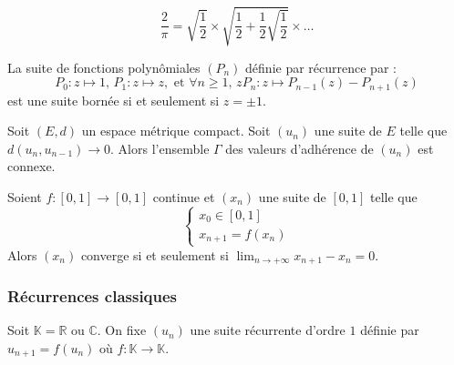   \begin{application}
    \[ \frac{2}{\pi} = \sqrt{\frac{1}{2}} \times \sqrt{\frac{1}{2} + \frac{1}{2} \sqrt{\frac{1}{2}}} \times \dots \]
  \end{application}


  \begin{example}
    La suite de fonctions polynômiales $(P_n)$ définie par récurrence par :
    \[ P_0 : z \mapsto 1, \, P_1 : z \mapsto z, \text{ et } \forall n \geq 1, \, zP_n : z \mapsto P_{n-1}(z)-P_{n+1}(z) \]
    est une suite bornée si et seulement si $z = \pm 1$.
  \end{example}


  \begin{theorem}
    Soit $(E, d)$ un espace métrique compact. Soit $(u_n)$ une suite de $E$ telle que $d(u_n,u_{n-1}) \longrightarrow 0$. Alors l'ensemble $\Gamma$ des valeurs d'adhérence de $(u_n)$ est connexe.
  \end{theorem}

  \begin{corollary}
    Soient $f : [0, 1] \rightarrow [0, 1]$ continue et $(x_n)$ une suite de $[0, 1]$ telle que
    \[ \begin{cases} x_0 \in [0, 1] \\ x_{n+1} = f(x_n) \end{cases} \]
    Alors $(x_n)$ converge si et seulement si $\lim_{n \rightarrow +\infty } x_{n+1} - x_n = 0$.
  \end{corollary}

  \subsubsection{Récurrences classiques}


  Soit $\mathbb{K} = \mathbb{R}$ ou $\mathbb{C}$. On fixe $(u_n)$ une suite récurrente d'ordre $1$ définie par $u_{n+1} = f(u_n)$ où $f : \mathbb{K} \rightarrow \mathbb{K}$.

